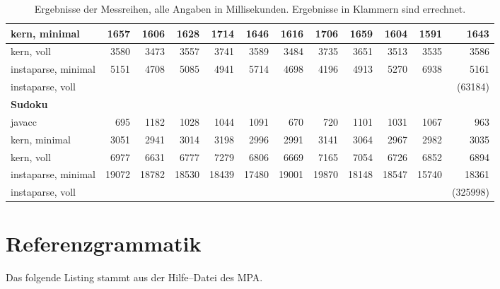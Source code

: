 \documentclass[ngerman,a4paper,abstracton,open=right,twoside=false,toc=listofnumbered,bibtotocnumbered]{scrreprt}
\begin{document}
\begin{table}[!h]
{{\begin{tabular}{|l|r|r|r|r|r|r|r|r|r|r|r|}
				kern, minimal   & 1657 & 1606 & 1628 & 1714 & 1646 & 1616 & 1706 & 1659 & 1604 & 1591 & 1643 \\ \hline
				kern, voll   & 3580 & 3473 & 3557 & 3741 & 3589 & 3484 & 3735 & 3651 & 3513 & 3535 & 3586 \\ \hline
				instaparse, minimal   & 5151 & 4708 & 5085 & 4941 & 5714 & 4698 & 4196 & 4913 & 5270 & 6938 & 5161 \\ \hline
				instaparse, voll   & \multicolumn{1}{l|}{} & \multicolumn{1}{l|}{} & \multicolumn{1}{l|}{} & \multicolumn{1}{l|}{} & \multicolumn{1}{l|}{} & \multicolumn{1}{l|}{} & \multicolumn{1}{l|}{} & \multicolumn{1}{l|}{} & \multicolumn{1}{l|}{} & \multicolumn{1}{l|}{} & (63184) \\ \hline
				\textbf{Sudoku} & \multicolumn{1}{l|}{} & \multicolumn{1}{l|}{} & \multicolumn{1}{l|}{} & \multicolumn{1}{l|}{} & \multicolumn{1}{l|}{} & \multicolumn{1}{l|}{} & \multicolumn{1}{l|}{} & \multicolumn{1}{l|}{} & \multicolumn{1}{l|}{} & \multicolumn{1}{l|}{} & \multicolumn{1}{l|}{} \\ \hline
				javacc  & 695 & 1182 & 1028 & 1044 & 1091 & 670 & 720 & 1101 & 1031 & 1067 & 963 \\ \hline
				kern, minimal   & 3051 & 2941 & 3014 & 3198 & 2996 & 2991 & 3141 & 3064 & 2967 & 2982 & 3035 \\ \hline
				kern, voll   & 6977 & 6631 & 6777 & 7279 & 6806 & 6669 & 7165 & 7054 & 6726 & 6852 & 6894 \\ \hline
				instaparse, minimal   & 19072 & 18782 & 18530 & 18439 & 17480 & 19001 & 19870 & 18148 & 18547 & 15740 & 18361 \\ \hline
				instaparse, voll   & \multicolumn{1}{l|}{} & \multicolumn{1}{l|}{} & \multicolumn{1}{l|}{} & \multicolumn{1}{l|}{} & \multicolumn{1}{l|}{} & \multicolumn{1}{l|}{} & \multicolumn{1}{l|}{} & \multicolumn{1}{l|}{} & \multicolumn{1}{l|}{} & \multicolumn{1}{l|}{} & (325998) \\ \hline
				\end{tabular}
			}
		}
		\label{Messergebnisse}
		\caption{Ergebnisse der Messreihen, alle Angaben in Millisekunden. Ergebnisse in Klammern sind errechnet.}
\end{table}

\newpage
\section{Referenzgrammatik}\label{refgrammatik}

Das folgende Listing stammt aus der Hilfe--Datei des MPA. \cite{mpa}
\end{document}
